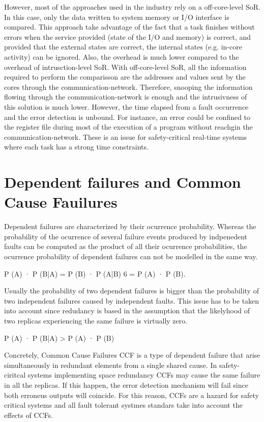 However, most of the approaches used in the industry rely on a off-core-level SoR. In this case, only the data written to system memory or I/O interface is compared. This approach take advantage of the fact that a task finishes without errors when the service provided (state of the I/O and memory) is correct, and provided that the external states are correct, the internal states (e.g. in-core activity) can be ignored. Also, the overhead is much lower compared to the overhead of intrusction-level SoR. With off-core-level SoR, all the information required to perform the comparisson are the addresses and values sent by the cores through the communication-network. Therefore, snooping the information flowing through the communication-network is enough and the intrusivness of this solution is much lower. However, the time elapsed from a fault occurrence and the error detection is unbound. For instance, an error could be confined to the register file during most of the execution of a program without reachgin the communication-network. These is an issue for safety-critical real-time systems where each task has a strong time constraints.  


\section{Dependent failures and Common Cause Fauilures}

Dependent failures are characterized by their ocurrence probability. Whereas the probability of the ocurrence of several failure events produced by indpenedent faults can be computed as the product of all their ocurrence probabilities, the ocurrence probability of dependent failures can not be modelled in the same way. 


P (A) · P (B|A) = P (B) · P (A|B) 6 = P (A) · P (B).

Usually the probability of two dependent failures is bigger than the probability of two independent failures caused by independent faults. This issue has to be taken into account since redudancy is based in the assumption that the likelyhood of two replicas experiencing the same failure is virtually zero.

P (A) · P (B|A) > P (A) · P (B)

Concretely, Common Cause Failures CCF is a type of dependent failure that arise simultaneously in redundant elements from a single shared cause. In safety-ciritcal systems implementing space redundancy CCFs may cause the same failure in all the replicas. If this happen, the error detection mechanism will fail since both erroneus outputs will coincide. For this reason, CCFs are a hazard for safety critical systems and all fault tolerant systmes standars take into account the effects of CCFs.


